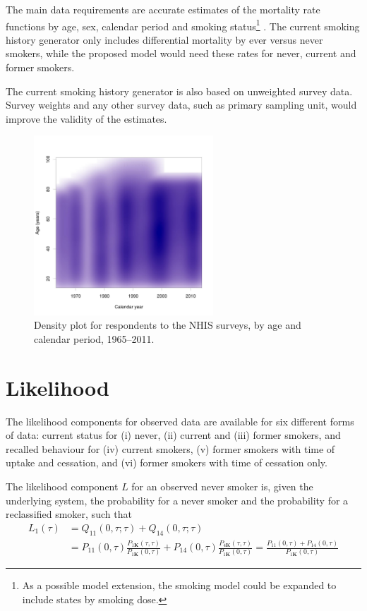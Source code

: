 \documentclass[11pt,a4paper]{article}
\newcommand{\K}{\ensuremath{\bm{K}}}
\begin{document}
The main data requirements are accurate estimates of the mortality
rate functions by age, sex, calendar period and smoking
status\footnote{As a possible model extension, the smoking model could
  be expanded to include states by smoking dose.}  . The current
smoking history generator only includes differential mortality by ever
versus never smokers, while the proposed model would need these rates
for never, current and former smokers.

The current smoking history generator is also based on unweighted
survey data. Survey weights and any other survey data, such as primary
sampling unit, would improve the validity of the estimates. 

\begin{figure}[ht]
  \centering
  \includegraphics[width=0.6\textwidth]{nhis_density.jpg}    
  \caption{Density plot for respondents to the NHIS surveys, by age and calendar period, 1965--2011.}
  \label{fig:nhis}
\end{figure}


\section{Likelihood}

The likelihood components for observed data are available for six
different forms of data: current status for (i) never, (ii) current
and (iii) former smokers, and recalled behaviour for (iv) current
smokers, (v) former smokers with time of uptake and cessation, and
(vi) former smokers with time of cessation only.  

The likelihood component $L$ for an observed never smoker is, given the underlying system, the 
probability for a never smoker and the probability for a reclassified smoker, such that
\begin{align*}
L_1(\tau) & = Q_{11}(0,\tau;\tau)+Q_{14}(0,\tau;\tau) \\
& = P_{11}(0,\tau)\frac{P_{1\K}(\tau,\tau)}{P_{1\K}(0,\tau)} +P_{14}(0,\tau)\frac{P_{4\K}(\tau,\tau)}{P_{1\K}(0,\tau)} 
= \frac{P_{11}(0,\tau)+P_{14}(0,\tau)}{P_{1\K}(0,\tau)}  
\end{align*}
\end{document}
